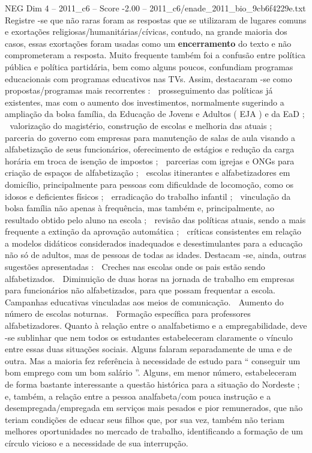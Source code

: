 \begin{textsample}{NEG Dim 4 – 2011\_c6 – Score -2.00 – 2011\_c6/enade\_2011\_bio\_9cb6f4229e.txt}
Registre -se que não raras foram as respostas que se utilizaram de lugares comuns e exortações religiosas/humanitárias/cívicas, contudo, na grande maioria dos casos, essas exortações foram usadas como um \textbf{encerramento} do texto e não comprometeram a resposta.
Muito frequente também foi a confusão entre política pública e política partidária, bem como alguns poucos, confundiam programas educacionais com programas educativos nas TVs.
Assim, destacaram -se como propostas/programas mais recorrentes :  prosseguimento das políticas já existentes, mas com o aumento dos investimentos, normalmente sugerindo a ampliação da bolsa família, da Educação de Jovens e Adultos ( EJA ) e da EaD ;  valorização do magistério, construção de escolas e melhoria das atuais ;  parceria do governo com empresas para manutenção de salas de aula visando a alfabetização de seus funcionários, oferecimento de estágios e redução da carga horária em troca de isenção de impostos ;  parcerias com igrejas e ONGs para criação de espaços de alfabetização ;  escolas itinerantes e alfabetizadores em domicílio, principalmente para pessoas com dificuldade de locomoção, como os idosos e deficientes físicos ;  erradicação do trabalho infantil ;  vinculação da bolsa família não apenas à frequência, mas também e, principalmente, ao resultado obtido pelo aluno na escola ;  revisão das políticas atuais, sendo a mais frequente a extinção da aprovação automática ;  críticas consistentes em relação a modelos didáticos considerados inadequados e desestimulantes para a educação não só de adultos, mas de pessoas de todas as idades.
Destacam -se, ainda, outras sugestões apresentadas :  Creches nas escolas onde os pais estão sendo alfabetizados.  Diminuição de duas horas na jornada de trabalho em empresas para funcionários não alfabetizados, para que possam frequentar a escola.  Campanhas educativas vinculadas aos meios de comunicação.  Aumento do número de escolas noturnas.  Formação específica para professores alfabetizadores.
Quanto à relação entre o analfabetismo e a empregabilidade, deve -se sublinhar que nem todos os estudantes estabeleceram claramente o vínculo entre essas duas situações sociais.
Alguns falaram separadamente de uma e de outra.
Mas a maioria fez referência à necessidade de estudo para “ conseguir um bom emprego com um bom salário ”.
Alguns, em menor número, estabeleceram de forma bastante interessante a questão histórica para a situação do Nordeste ; e, também, a relação entre a pessoa analfabeta/com pouca instrução e a desempregada/empregada em serviços mais pesados e pior remunerados, que não teriam condições de educar seus filhos que, por sua vez, também não teriam melhores oportunidades no mercado de trabalho, identificando a formação de um círculo vicioso e a necessidade de sua interrupção.

\end{textsample}
